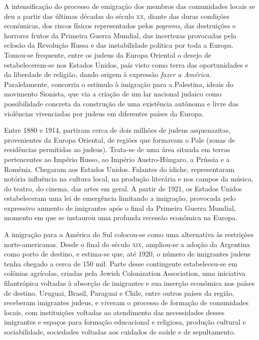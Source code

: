 A intensificação do processo de emigração dos membros das comunidades
locais se deu a partir das últimas décadas do século \textsc{xx}, diante das
duras condições econômicas, dos riscos físicos representados pelos
\textit{pogroms}, das destruições e horrores frutos da Primeira Guerra Mundial,
das incertezas provocadas pela eclosão da Revolução Russa e das
instabilidade politica por toda a Europa. Tomou-se frequente, entre os
judeus da Europa Oriental o desejo de estabelecerem-se nos Estados
Unidos, país visto como terra das oportunidades e da liberdade de
religião, dando origem à expressão \textit{fazer a América}. Paralelamente,
concorria o estímulo à imigração para a Palestina, ideais do movimento
Sionista, que via a criação de um lar nacional judaico como
possibilidade concreta da construção de uma existência autônoma e livre
das violências vivenciadas por judeus em diferentes países da Europa.

Entre 1880 e 1914, partiram cerca de dois milhões de judeus
asquenazitas, provenientes da Europa Oriental, de regiões que formavam o
Pale (zonas de residências permitidas ao judeus). Trata-se de uma área
situada em terras pertencentes ao Império Russo, ao Império
Austro-Húngaro, a Prússia e a Romênia. Chegaram aos Estados Unidos.
Falantes do ídiche, representaram notória influência na cultura local,
na produção literária e nos campos da música, do teatro, do cinema, das
artes em geral. A partir de 1921, os Estados Unidos estabeleceram uma
lei de emergência limitando a imigração, provocada pelo expressivo
aumento de imigrantes após o final da Primeira Guerra Mundial, momento
em que se instaurou uma profunda recessão econômica na Europa.

A imigração para a América do Sul colocou-se como uma alternativa às
restrições norte-americanas. Desde o final do século \textsc{xix}, ampliou-se a
adoção da Argentina como porto de destino, e estima-se que, até 1920, o
número de imigrantes judeus tenha chegado a cerca de 150 mil. Parte
desse contingente estabeleceu-se em colônias agrícolas, criadas pela
Jewish Colonization Association, uma iniciativa filantrópica voltadas à
absorção de imigrantes e sua inserção econômica nos países de destino.
Uruguai, Brasil, Paraguai e Chile, entre outros países da região,
receberam imigrantes judeus, e viveram o processo de formação de
comunidades locais, com instituições voltadas ao atendimento das
necessidades desses imigrantes e espaços para formação educacional e
religiosa, produção cultural e sociabilidade, sociedades voltadas aos
cuidados de saúde e de sepultamento.

